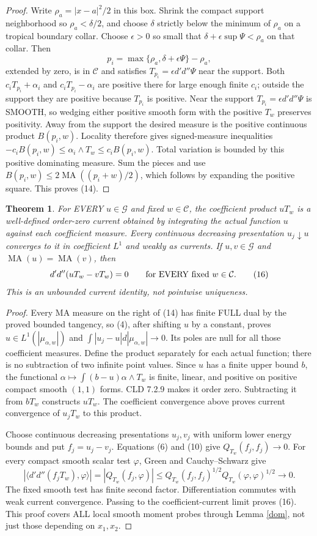 \documentclass[11pt]{article}
\newtheorem{theorem}{Theorem}
\newcommand{\C}{\mathcal C}
\newcommand{\G}{\mathcal G}
\newcommand{\MA}{\operatorname{MA}}
\begin{document}
\begin{proof}
Write $\rho_a=|x-a|^2/2$ in this box. Shrink the compact support neighborhood
so $\rho_a<\delta/2$, and choose $\delta$ strictly below the minimum of
$\rho_a$ on a tropical boundary collar. Choose $\epsilon>0$ so small that
$\delta+\epsilon\sup\Psi<\rho_a$ on that collar. Then
\[
 p_i=\max\{\rho_a,\delta+\epsilon\Psi\}-\rho_a,
\]
extended by zero, is in $\C$ and satisfies
$T_{p_i}=\epsilon d'd''\Psi$ near the support. Both
$c_iT_{p_i}+\alpha_i$ and $c_iT_{p_i}-\alpha_i$ are positive there for
large enough finite $c_i$; outside the support they are positive because
$T_{p_i}$ is positive. Near the support $T_{p_i}=\epsilon d'd''\Psi$ is SMOOTH,
so wedging either positive smooth form with the positive $T_w$ preserves
positivity. Away from the support the desired measure is the positive
continuous product $B(p_i,w)$. Locality therefore gives signed-measure inequalities
$-c_iB(p_i,w)\le\alpha_i\wedge T_w\le c_iB(p_i,w)$.
Total variation is bounded by this positive dominating measure. Sum the
pieces and use
$B(p_i,w)\le2\MA((p_i+w)/2)$, which follows by expanding the positive
square. This proves (14).
\end{proof}

\begin{theorem}\label{unbounded}
For EVERY $u\in\G$ and fixed $w\in\C$, the coefficient product $uT_w$
is a well-defined order-zero current obtained by integrating the actual
function $u$ against each coefficient measure. Every continuous decreasing
presentation $u_j\downarrow u$ converges to it in coefficient $L^1$ and
weakly as currents. If $u,v\in\G$ and $\MA(u)=\MA(v)$, then
\[
 d'd''(uT_w-vT_w)=0\qquad\hbox{for EVERY fixed }w\in\C.    \tag{16}
\]
This is an unbounded current identity, not pointwise uniqueness.
\end{theorem}
\begin{proof}
Every MA measure on the right of (14) has finite FULL dual by the proved
bounded tangency, so (4), after shifting $u$ by a constant, proves
$u\in L^1(|\mu_{\alpha,w}|)$ and
$\int|u_j-u|d|\mu_{\alpha,w}|\to0$. Its poles are null for all those
coefficient measures. Define the product separately for each actual function;
there is no subtraction of two infinite point values.
Since $u$ has a finite upper bound $b$, the functional
$\alpha\mapsto\int(b-u)\alpha\wedge T_w$ is finite, linear, and positive
on positive compact smooth $(1,1)$ forms. CLD 7.2.9 makes it order zero.
Subtracting it from $bT_w$ constructs $uT_w$. The coefficient convergence
above proves current convergence of $u_jT_w$ to this product.

Choose continuous decreasing presentations $u_j,v_j$ with uniform lower
energy bounds and put $f_j=u_j-v_j$.
Equations (6) and (10) give $Q_{T_w}(f_j,f_j)\to0$.
For every compact smooth scalar test $\varphi$, Green and Cauchy--Schwarz give
\[
 |\langle d'd''(f_jT_w),\varphi\rangle|
 =|Q_{T_w}(f_j,\varphi)|
 \le Q_{T_w}(f_j,f_j)^{1/2}Q_{T_w}(\varphi,\varphi)^{1/2}
 \longrightarrow0.
\]
The fixed smooth test has finite second factor. Differentiation commutes with
weak current convergence. Passing to the coefficient-current limit proves
(16). This proof covers ALL local smooth moment probes through Lemma
\ref{dom}, not just those depending on $x_1,x_2$.
\end{proof}
\end{document}
